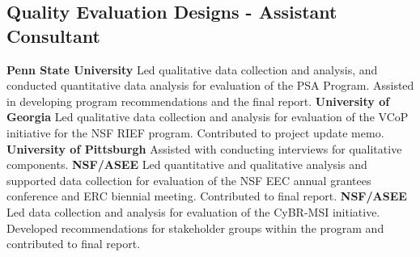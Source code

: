 \subsection{Quality Evaluation Designs - Assistant Consultant}
\begin{cvtable}
        {\color{cvsectioncolor}{Penn State Acoustics Program \\(PSA Program)}}
        {\textbf{Penn State University}}
        {Led qualitative data collection and analysis, and conducted quantitative data analysis for evaluation of the PSA Program. Assisted in developing program recommendations and the final report.}
        {\color{cvsectioncolor}{RIEF - Virtual Community of Practice \\(RIEF: VCoP)}}
        {\textbf{University of Georgia}}
        {Led qualitative data collection and analysis for evaluation of the VCoP initiative for the NSF RIEF program. Contributed to project update memo.}
    \cvitem{}
        {\color{cvsectioncolor}{IGE - Personalized Learning Module for Graduate STEM Education \\(IGE: PLM)}}
        {\textbf{University of Pittsburgh}}
        {Assisted with conducting interviews for qualitative components.}  
        {\color{cvsectioncolor}{Engineering Education and Research Centers \\(EEC/ERC)} }
        {\textbf{NSF/ASEE}}
        {Led quantitative and qualitative analysis and supported data collection for evaluation of the NSF EEC annual grantees conference and ERC biennial meeting. Contributed to final report.}
    \cvitem{}
        {\color{cvsectioncolor}{Capacity Building for Research at Minority Serving Institutions (CyBR-MSI)}}
        {\textbf{NSF/ASEE}}
        {Led data collection and analysis for evaluation of the CyBR-MSI initiative. Developed recommendations for stakeholder groups within the program and contributed to final report.}
\end{cvtable}